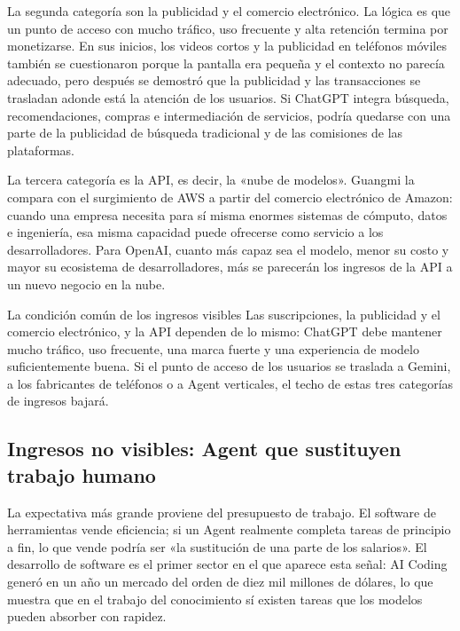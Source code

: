 La segunda categoría son la publicidad y el comercio electrónico. La lógica es que un punto de acceso con mucho tráfico, uso frecuente y alta retención termina por monetizarse. En sus inicios, los videos cortos y la publicidad en teléfonos móviles también se cuestionaron porque la pantalla era pequeña y el contexto no parecía adecuado, pero después se demostró que la publicidad y las transacciones se trasladan adonde está la atención de los usuarios. Si ChatGPT integra búsqueda, recomendaciones, compras e intermediación de servicios, podría quedarse con una parte de la publicidad de búsqueda tradicional y de las comisiones de las plataformas.

La tercera categoría es la API, es decir, la «nube de modelos». Guangmi la compara con el surgimiento de AWS a partir del comercio electrónico de Amazon: cuando una empresa necesita para sí misma enormes sistemas de cómputo, datos e ingeniería, esa misma capacidad puede ofrecerse como servicio a los desarrolladores. Para OpenAI, cuanto más capaz sea el modelo, menor su costo y mayor su ecosistema de desarrolladores, más se parecerán los ingresos de la API a un nuevo negocio en la nube.

\begin{importantbox}{La condición común de los ingresos visibles}
Las suscripciones, la publicidad y el comercio electrónico, y la API dependen de lo mismo: ChatGPT debe mantener mucho tráfico, uso frecuente, una marca fuerte y una experiencia de modelo suficientemente buena. Si el punto de acceso de los usuarios se traslada a Gemini, a los fabricantes de teléfonos o a Agent verticales, el techo de estas tres categorías de ingresos bajará.
\end{importantbox}

\subsection{Ingresos no visibles: Agent que sustituyen trabajo humano}

La expectativa más grande proviene del presupuesto de trabajo. El software de herramientas vende eficiencia; si un Agent realmente completa tareas de principio a fin, lo que vende podría ser «la sustitución de una parte de los salarios». El desarrollo de software es el primer sector en el que aparece esta señal: AI Coding generó en un año un mercado del orden de diez mil millones de dólares, lo que muestra que en el trabajo del conocimiento sí existen tareas que los modelos pueden absorber con rapidez.

